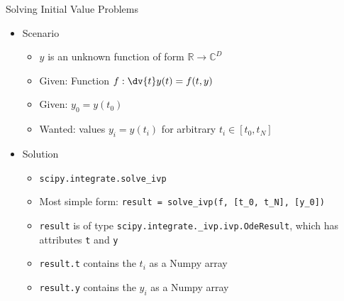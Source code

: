 
\begin{frame}{Solving Initial Value Problems}
%
\begin{itemize}
\item Scenario
	\begin{itemize}
	\item $y$ is an unknown function of form $ \mathbb{R} \to \mathbb{C}^{D}$
	\item Given: Function $f: \dv{t} y(t) = f(t, y)$
	\item Given: $y_0 = y(t_0)$
	\item Wanted: values $y_i = y(t_i)$ for arbitrary $t_i \in [t_0, t_N]$
	\end{itemize}
\item Solution
	\begin{itemize}
	\item \texttt{scipy.integrate.solve\_ivp}
	\item Most simple form: \texttt{result = solve\_ivp(f, [t\_0, t\_N], [y\_0])}
	\item \texttt{result} is of type \texttt{scipy.integrate.\_ivp.ivp.OdeResult}, which has attributes \texttt{t} and \texttt{y}
	\item \texttt{result.t} contains the $t_i$ as a Numpy array
	\item \texttt{result.y} contains the $y_i$ as a Numpy array
	\end{itemize}
\end{itemize}
%
\end{frame}


